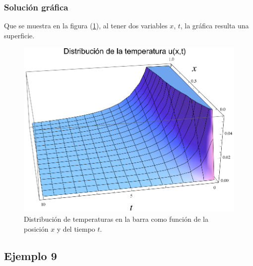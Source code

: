 \begin{frame}
\frametitle{Solución gráfica}
Que se muestra en la figura (\ref{fig:figura_plot_Ejemplo_06_02}), al tener dos variables $x$, $t$, la gráfica resulta una superficie.
\end{frame}
\begin{frame}[plain]
\begin{figure}[H]
    \centering
    \includegraphics[scale=0.8]{Imagenes/Plot_Ejemplo_06_02.eps}
    \caption{Distribución de temperaturas en la barra como función de la posición $x$ y del tiempo $t$.}
    \label{fig:figura_plot_Ejemplo_06_02}
\end{figure}
\end{frame}

\subsection*{Ejemplo 9}

